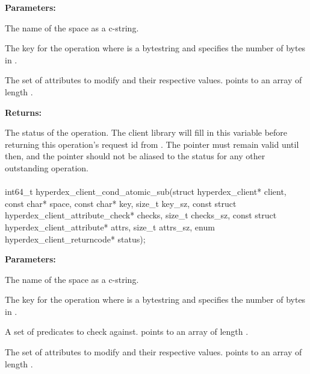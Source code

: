 \noindent\textbf{Parameters:}
\begin{description}[labelindent=\widthof{{\code{attrs}, \code{attrs\_sz}}},leftmargin=*,noitemsep,nolistsep,align=right]
\item[\code{space}] The name of the space as a c-string.
\item[\code{key}, \code{key\_sz}] The key for the operation where  is a bytestring and  specifies the number of bytes in .
\item[\code{attrs}, \code{attrs\_sz}] The set of attributes to modify and their respective values.   points to an array of length .
\end{description}

\noindent\textbf{Returns:}
\begin{description}[labelindent=\widthof{{\code{status}}},leftmargin=*,noitemsep,nolistsep,align=right]
\item[\code{status}] The status of the operation.  The client library will fill in this variable before returning this operation's request id from .  The pointer must remain valid until then, and the pointer should not be aliased to the status for any other outstanding operation.
\end{description}

\paragraph{}
\begin{ccode}
int64_t hyperdex_client_cond_atomic_sub(struct hyperdex_client* client,
                const char* space,
                const char* key, size_t key_sz,
                const struct hyperdex_client_attribute_check* checks, size_t checks_sz,
                const struct hyperdex_client_attribute* attrs, size_t attrs_sz,
                enum hyperdex_client_returncode* status);
\end{ccode}
\funcdesc 

\noindent\textbf{Parameters:}
\begin{description}[labelindent=\widthof{{\code{checks}, \code{checks\_sz}}},leftmargin=*,noitemsep,nolistsep,align=right]
\item[\code{space}] The name of the space as a c-string.
\item[\code{key}, \code{key\_sz}] The key for the operation where  is a bytestring and  specifies the number of bytes in .
\item[\code{checks}, \code{checks\_sz}] A set of predicates to check against.   points to an array of length .
\item[\code{attrs}, \code{attrs\_sz}] The set of attributes to modify and their respective values.   points to an array of length .
\end{description}

